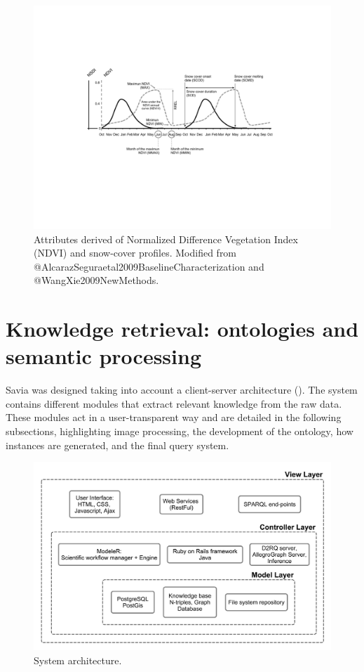\begin{figure}
    \centering
    \includegraphics[width=\textwidth]{img/onto/onto-figure-indicators}\caption{Attributes derived of Normalized Difference Vegetation Index (NDVI) and snow-cover profiles. Modified from @AlcarazSeguraetal2009BaselineCharacterization and @WangXie2009NewMethods.}\label{fig:onto:indicator}
\end{figure}

\section{Knowledge retrieval: ontologies and semantic processing}\label{sec:onto:Semantic}

Savia was designed taking into account a client-server architecture (). The system contains different modules that extract relevant knowledge from the raw data. These modules act in a user-transparent way and are detailed in the following subsections, highlighting image processing, the development of the ontology, how instances are generated, and the final query system.

\begin{figure}
    \centering
    \includegraphics[width=\textwidth]{img/onto/onto-architecture}\caption{System architecture.}\label{fig:onto:architecture}
\end{figure}

